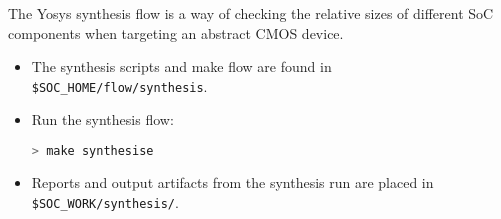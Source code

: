 
The Yosys synthesis flow is a way of checking the relative
sizes of different SoC components when targeting an abstract CMOS
device.

\begin{itemize}

\item The synthesis scripts and make flow are found in
    {\tt \$SOC\_HOME/flow/synthesis}.

\item Run the synthesis flow:

\begin{lstlisting}[language=bash,style=block]
> make synthesise
\end{lstlisting}

\item Reports and output artifacts from the synthesis run are placed
    in {\tt \$SOC\_WORK/synthesis/}.

\end{itemize}

